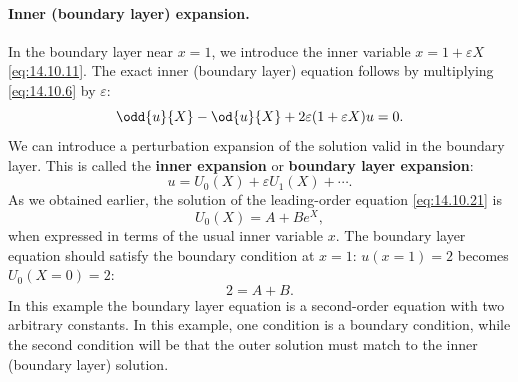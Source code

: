 \paragraph{Inner (boundary layer) expansion.}
In the boundary layer near $x = 1$, we introduce the inner variable $x = 1 + \varepsilon X$ \eqref{eq:14.10.11}. The exact inner (boundary layer) equation follows by multiplying \eqref{eq:14.10.6} by $\varepsilon$:
\begin{equation}
\odd{u}{X} - \od{u}{X} + 2\varepsilon(1 + \varepsilon X)u = 0.
\label{eq:14.10.19}
\end{equation}
We can introduce a perturbation expansion of the solution valid in the boundary layer. This is called the \textbf{inner expansion} or \textbf{boundary layer expansion}:
\begin{equation}
u = U_0(X) + \varepsilon U_1(X) + \cdots.
\label{eq:14.10.20}
\end{equation}
As we obtained earlier, the solution of the leading-order equation \eqref{eq:14.10.21} is
\begin{equation}
U_0(X) = A + Be^X,
\label{eq:14.10.23}
\end{equation}
when expressed in terms of the usual inner variable $x$. The boundary layer equation should satisfy the boundary condition at $x = 1$: $u(x = 1) = 2$ becomes $U_0(X = 0) = 2$:
\begin{equation}
2 = A + B.
\label{eq:14.10.24}
\end{equation}
In this example the boundary layer equation is a second-order equation with two arbitrary constants. In this example, one condition is a boundary condition, while the second condition will be that the outer solution must match to the inner (boundary layer) solution.

